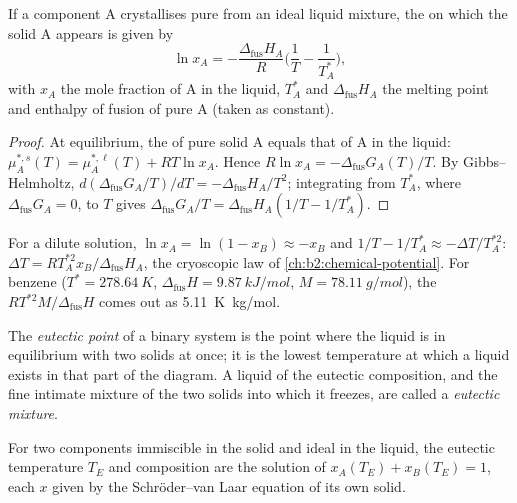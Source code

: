 \begin{theorem}\label{thm:b2:solid-liquid-diagrams:schroder}
If a component A crystallises pure from an ideal liquid mixture, the 
on which the solid A appears is given by
\[
  \ln x_A = -\frac{\Delta_{\text{fus}}H_A}{R}\Big(\frac1T - \frac1{T_A^*}\Big),
\]
with $x_A$ the mole fraction of A in the liquid, $T_A^*$ and
$\Delta_{\text{fus}}H_A$ the melting point and enthalpy of fusion of pure A
(taken as constant).
\end{theorem}

\begin{proof}
At equilibrium, the  of pure solid A equals that of A in the
liquid: $\mu_A^{*,s}(T) = \mu_A^{*,\ell}(T) + RT\ln x_A$. Hence $R\ln x_A =
-\Delta_{\text{fus}}G_A(T)/T$. By Gibbs--Helmholtz, $d(\Delta_{\text{fus}}G_A/T)/
dT = -\Delta_{\text{fus}}H_A/T^2$; integrating from $T_A^*$, where
$\Delta_{\text{fus}}G_A = 0$, to $T$ gives $\Delta_{\text{fus}}G_A/T =
\Delta_{\text{fus}}H_A(1/T - 1/T_A^*)$.
\end{proof}

For a dilute solution, $\ln x_A = \ln(1 - x_B) \approx -x_B$ and $1/T -
1/T_A^* \approx -\Delta T/T_A^{*2}$: $\Delta T = RT_A^{*2}x_B/\Delta_{\text{fus}}H_A$,
the cryoscopic law of \cref{ch:b2:chemical-potential}. For benzene ($T^* =
\qty{278.64}{K}$, $\Delta_{\text{fus}}H = \qty{9.87}{kJ/mol}$, $M =
\qty{78.11}{g/mol}$), the  $RT^{*2}M/\Delta_{\text{fus}}H$
comes out as \qty{5.11}{K.kg/mol}.

\begin{definition}[Eutectic]\label{def:b2:solid-liquid-diagrams:eutectic}
The \emph{eutectic point} of a binary system is the
point where the liquid is in equilibrium with two solids at once; it is the
lowest temperature at which a liquid exists in that part of the diagram. A
liquid of the eutectic composition, and the fine intimate mixture of the two
solids into which it freezes, are called a \emph{eutectic
mixture}.
\end{definition}

\begin{corollary}\label{cor:b2:solid-liquid-diagrams:eutectic}
For two components immiscible in the solid and ideal in the liquid, the
eutectic temperature $T_E$ and composition are the solution of
$x_A(T_E) + x_B(T_E) = 1$, each $x$ given by the Schröder--van Laar equation
of its own solid.
\end{corollary}

